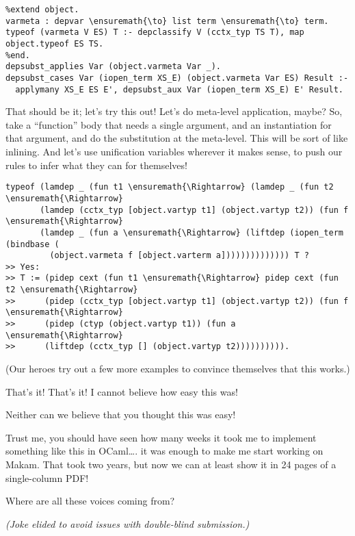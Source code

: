 \vspace{-0.5em}

\begin{verbatim}
%extend object.
varmeta : depvar \ensuremath{\to} list term \ensuremath{\to} term.
typeof (varmeta V ES) T :- depclassify V (cctx_typ TS T), map object.typeof ES TS.
%end.
depsubst_applies Var (object.varmeta Var _).
depsubst_cases Var (iopen_term XS_E) (object.varmeta Var ES) Result :-
  applymany XS_E ES E', depsubst_aux Var (iopen_term XS_E) E' Result.
\end{verbatim}

\heroADVISOR{} That should be it; let's try this out! Let's do meta-level
application, maybe? So, take a ``function'' body that needs a single
argument, and an instantiation for that argument, and do the
substitution at the meta-level. This will be sort of like inlining. And
let's use unification variables wherever it makes sense, to push our
rules to infer what they can for themselves!

\begin{verbatim}
typeof (lamdep _ (fun t1 \ensuremath{\Rightarrow} (lamdep _ (fun t2 \ensuremath{\Rightarrow}
       (lamdep (cctx_typ [object.vartyp t1] (object.vartyp t2)) (fun f \ensuremath{\Rightarrow}
       (lamdep _ (fun a \ensuremath{\Rightarrow} (liftdep (iopen_term (bindbase (
         (object.varmeta f [object.varterm a]))))))))))))) T ?
>> Yes:
>> T := (pidep cext (fun t1 \ensuremath{\Rightarrow} pidep cext (fun t2 \ensuremath{\Rightarrow}
>>      (pidep (cctx_typ [object.vartyp t1] (object.vartyp t2)) (fun f \ensuremath{\Rightarrow}
>>      (pidep (ctyp (object.vartyp t1)) (fun a \ensuremath{\Rightarrow}
>>      (liftdep (cctx_typ [] (object.vartyp t2)))))))))).
\end{verbatim}

\begin{scenecomment}
(Our heroes try out a few more examples to convince themselves that this works.)
\end{scenecomment}

\heroSTUDENT{} That's it! That's it! I cannot believe how easy this was!

\heroAUDIENCE{} Neither can we believe that you thought this was easy!

\heroAUTHOR{} Trust me, you should have seen how many weeks it took me to
implement something like this in OCaml\ldots{}. it was enough to make me
start working on Makam. That took two years, but now we can at least
show it in 24 pages of a single-column PDF!

\heroADVISOR{} Where are all these voices coming from?

\heroSTUDENT{}
\textit{(Joke elided to avoid issues with double-blind submission.)}

